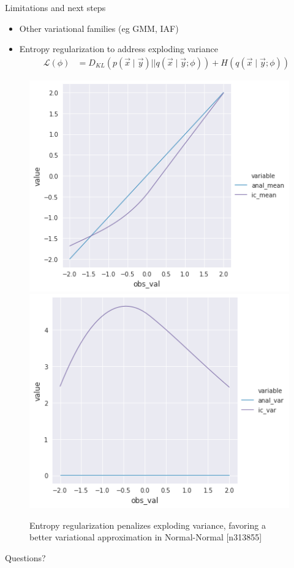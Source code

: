 \documentclass{beamer}
\begin{document}
\begin{frame}[fragile]{Limitations and next steps}
    \begin{itemize}
        \item Other variational families (eg GMM, IAF)
        \item Entropy regularization to address exploding variance
        \begin{align*}
            \mathcal{L}(\phi)
            &= D_{KL}(p(\vec{x} \mid \vec{y}) || q(\vec{x} \mid \vec{y}; \phi) ) + H(q(\vec{x} \mid \vec{y}; \phi))
        \end{align*}
    \end{itemize}
    
    \begin{figure}
        \centering
        \includegraphics[width=0.4\linewidth]{figures/ic-entropy-mean.png}
        \includegraphics[width=0.4\linewidth]{figures/ic-entropy-var.png}
        \caption{Entropy regularization penalizes exploding variance, favoring a better variational approximation in Normal-Normal
        [n313855]}
    \end{figure}

\end{frame}

{
\begin{frame}[standout]
  Questions?
\end{frame}
}
\end{document}
